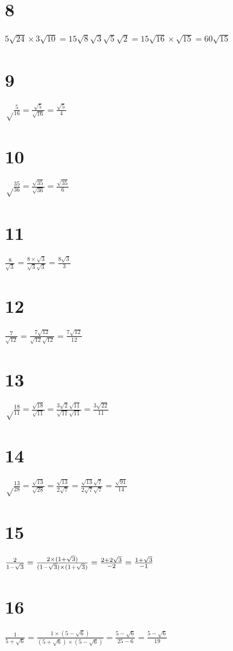 \documentclass{article}
\theoremstyle{definition}
\begin{document}
\section*{8}
$5\sqrt{24}\times 3\sqrt{10}=15\sqrt{8}\sqrt{3}\sqrt{5}\sqrt{2}=15\sqrt{16}\times\sqrt {15}=60\sqrt{15}$

\section*{9}
$\sqrt\frac{5}{16}=\frac{\sqrt{5}}{\sqrt{16}}=\frac{\sqrt{5}}{4}$

\section*{10}
$\sqrt\frac{35}{36}=\frac{\sqrt{35}}{\sqrt{36}}=\frac{\sqrt{35}}{6}$

\section*{11}
$\frac{8}{\sqrt{3}}=\frac{8\times \sqrt{3}}{\sqrt{3}\sqrt{3}}=\frac{8\sqrt{3}}{3}$

\section*{12}
$\frac{7}{\sqrt{12}}=\frac{7\sqrt{12}}{\sqrt{12}\sqrt{12}}=\frac{7\sqrt{12}}{12}$

\section*{13}
$\sqrt\frac{18}{11}=\frac{\sqrt{18}}{\sqrt{11}}=\frac{3\sqrt{2}\sqrt{11}}{\sqrt{11}\sqrt{11}}=\frac{3\sqrt{22}}{11}$

\section*{14}
$\sqrt\frac{13}{28}=\frac{\sqrt{13}}{\sqrt{28}}=\frac{\sqrt{13}}{2\sqrt{7}}=\frac{\sqrt{13}\sqrt{7}}{2\sqrt{7}\sqrt{7}}=
\frac{\sqrt{91}}{14}$

\section*{15}
$\frac{2}{1-\sqrt{3}}=\frac{2\times (1+\sqrt{3})}{(1-\sqrt{3})\times(1+\sqrt{3})}\newline 
=\frac{2+2\sqrt{3}}{-2}=\frac{1+\sqrt{3}}{-1}$

\section*{16}
$\frac{1}{5+\sqrt{6}}=\frac{1\times(5-\sqrt{6})}{(5+\sqrt{6})\times(5-\sqrt{6})}=\frac{5-\sqrt{6}}{25-6}=
\frac{5-\sqrt{6}}{19}$
\end{document}
